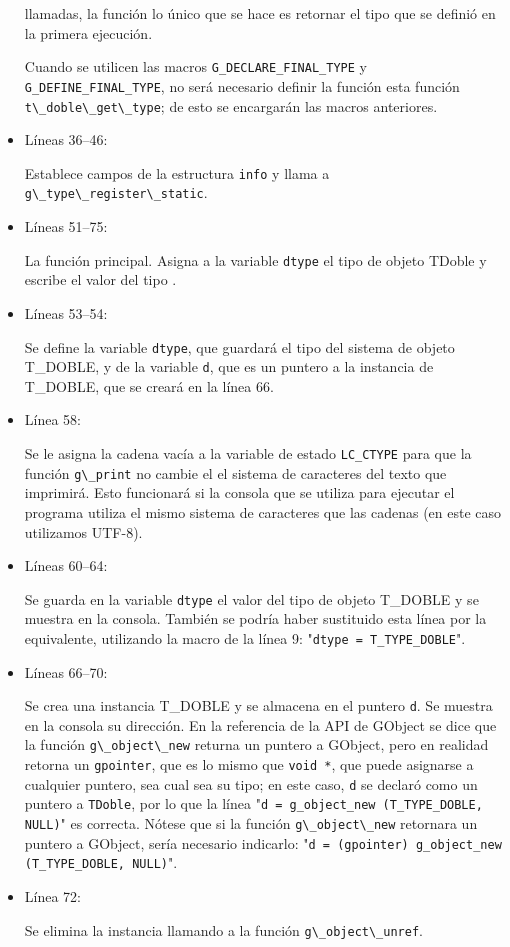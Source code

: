 \begin{itemize}
  llamadas, la función lo único que se hace es retornar el tipo que se definió en la primera ejecución.\par
  Cuando se utilicen las macros \texttt{G\_DECLARE\_FINAL\_TYPE} y \texttt{G\_DEFINE\_FINAL\_TYPE}, no será
  necesario definir la función esta función \passthrough{\lstinline!t\_doble\_get\_type!}; de esto se encargarán las macros anteriores.
\item Líneas 36--46:\par
  Establece campos de la estructura \texttt{info} y llama a \passthrough{\lstinline!g\_type\_register\_static!}.
\item Líneas 51--75:\par
  La función principal. Asigna a la variable \texttt{dtype} el tipo de objeto \textsf{TDoble} y escribe el valor
  del tipo .
\item Líneas 53--54:\par
  Se define la variable \texttt{dtype}, que guardará el tipo del sistema de objeto \textsf{T\_DOBLE}, y de la
  variable \texttt{d}, que es un puntero a la instancia de \textsf{T\_DOBLE}, que se creará en la línea 66.
\item Línea 58:\par
  Se le asigna la cadena vacía a la variable de estado \texttt{LC\_CTYPE} para que la función
  \passthrough{\lstinline!g\_print!} no cambie el el sistema de caracteres del texto que imprimirá.
  Esto funcionará si la consola que se utiliza para ejecutar el programa utiliza el mismo sistema de caracteres
  que las cadenas (en este caso utilizamos UTF-8).
\item Líneas 60--64:\par
  Se guarda en la variable \texttt{dtype} el valor del tipo de objeto \textsf{T\_DOBLE} y se muestra en la consola.
  También se podría haber sustituido esta línea por la equivalente, utilizando la macro de la línea 9:
  "\texttt{dtype = T\_TYPE\_DOBLE}".
\item Líneas 66--70:\par
  Se crea una instancia \textsf{T\_DOBLE} y se almacena en el puntero \texttt{d}. Se muestra en la consola su
  dirección. En la referencia de la API de \textsf{GObject} se dice que la función
  \passthrough{\lstinline!g\_object\_new!} returna un puntero a \textsf{GObject}, pero en realidad retorna un
  \texttt{gpointer}, que es lo mismo que \texttt{void *}, que puede asignarse a cualquier puntero, sea cual sea
  su tipo; en este caso, \texttt{d} se declaró como un puntero a \texttt{TDoble}, por lo que la línea
  "\texttt{d = g\_object\_new (T\_TYPE\_DOBLE, NULL)}" es correcta. Nótese que si la función
  \passthrough{\lstinline!g\_object\_new!} retornara un puntero a \textsf{GObject}, sería necesario indicarlo:
  "\texttt{d = (gpointer) g\_object\_new (T\_TYPE\_DOBLE, NULL)}".
\item Línea 72:\par
  Se elimina la instancia llamando a la función \passthrough{\lstinline!g\_object\_unref!}.
\end{itemize}
 \par


  


